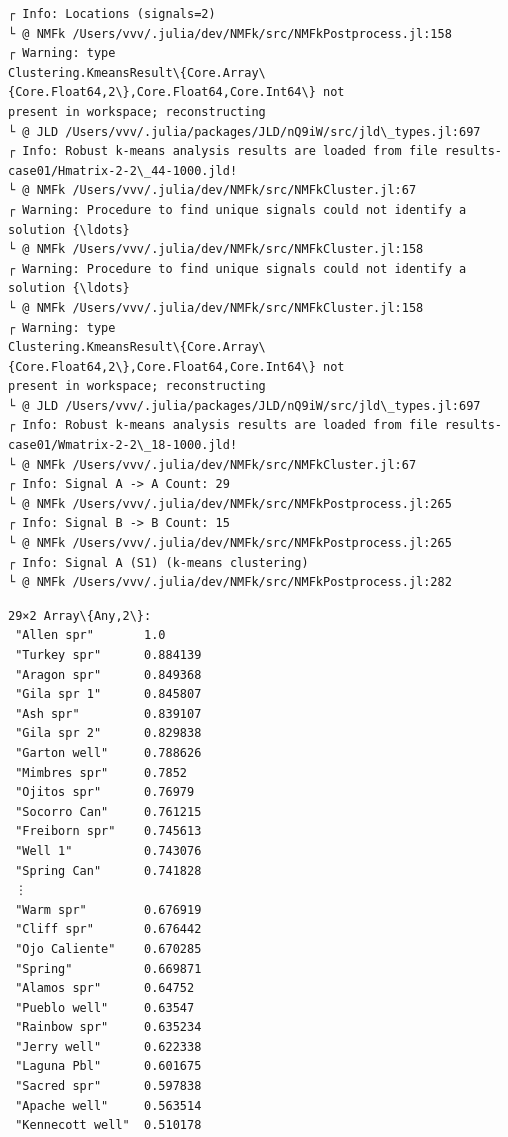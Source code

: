 \documentclass[11pt]{article}
\begin{document}
    \begin{Verbatim}[commandchars=\\\{\}]
┌ Info: Locations (signals=2)
└ @ NMFk /Users/vvv/.julia/dev/NMFk/src/NMFkPostprocess.jl:158
┌ Warning: type
Clustering.KmeansResult\{Core.Array\{Core.Float64,2\},Core.Float64,Core.Int64\} not
present in workspace; reconstructing
└ @ JLD /Users/vvv/.julia/packages/JLD/nQ9iW/src/jld\_types.jl:697
┌ Info: Robust k-means analysis results are loaded from file results-
case01/Hmatrix-2-2\_44-1000.jld!
└ @ NMFk /Users/vvv/.julia/dev/NMFk/src/NMFkCluster.jl:67
┌ Warning: Procedure to find unique signals could not identify a solution {\ldots}
└ @ NMFk /Users/vvv/.julia/dev/NMFk/src/NMFkCluster.jl:158
┌ Warning: Procedure to find unique signals could not identify a solution {\ldots}
└ @ NMFk /Users/vvv/.julia/dev/NMFk/src/NMFkCluster.jl:158
┌ Warning: type
Clustering.KmeansResult\{Core.Array\{Core.Float64,2\},Core.Float64,Core.Int64\} not
present in workspace; reconstructing
└ @ JLD /Users/vvv/.julia/packages/JLD/nQ9iW/src/jld\_types.jl:697
┌ Info: Robust k-means analysis results are loaded from file results-
case01/Wmatrix-2-2\_18-1000.jld!
└ @ NMFk /Users/vvv/.julia/dev/NMFk/src/NMFkCluster.jl:67
┌ Info: Signal A -> A Count: 29
└ @ NMFk /Users/vvv/.julia/dev/NMFk/src/NMFkPostprocess.jl:265
┌ Info: Signal B -> B Count: 15
└ @ NMFk /Users/vvv/.julia/dev/NMFk/src/NMFkPostprocess.jl:265
┌ Info: Signal A (S1) (k-means clustering)
└ @ NMFk /Users/vvv/.julia/dev/NMFk/src/NMFkPostprocess.jl:282
    \end{Verbatim}


    \begin{Verbatim}[commandchars=\\\{\}]
29×2 Array\{Any,2\}:
 "Allen spr"       1.0
 "Turkey spr"      0.884139
 "Aragon spr"      0.849368
 "Gila spr 1"      0.845807
 "Ash spr"         0.839107
 "Gila spr 2"      0.829838
 "Garton well"     0.788626
 "Mimbres spr"     0.7852
 "Ojitos spr"      0.76979
 "Socorro Can"     0.761215
 "Freiborn spr"    0.745613
 "Well 1"          0.743076
 "Spring Can"      0.741828
 ⋮
 "Warm spr"        0.676919
 "Cliff spr"       0.676442
 "Ojo Caliente"    0.670285
 "Spring"          0.669871
 "Alamos spr"      0.64752
 "Pueblo well"     0.63547
 "Rainbow spr"     0.635234
 "Jerry well"      0.622338
 "Laguna Pbl"      0.601675
 "Sacred spr"      0.597838
 "Apache well"     0.563514
 "Kennecott well"  0.510178
    \end{Verbatim}
\end{document}
